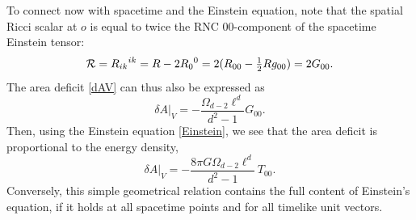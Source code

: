 \documentclass[aps,prd,showpacs,groupedaddress,nofootinbib,longbibliography,12pt]{revtex4-1}
\def\beq{\begin{equation}}
\def\eeq{\end{equation}}
\def\d{\delta}\def\D{\Delta}
\def\O{\Omega}
\def\half{{\textstyle{\frac{1}{2}}}}
\begin{document}
To connect now with spacetime and the Einstein equation, note that the spatial Ricci scalar 
at $o$ is equal to twice the RNC $00$-component of the spacetime Einstein tensor: 
%
\beq\label{RG00}
{\cal R}=R_{ik}{}^{ik}=R-2R_0{}^0=2(R_{00}-\half R g_{00})=2G_{00}.
\eeq
%
The area deficit \eqref{dAV} can thus also be expressed as 
%
\beq\label{dAVG}
\d A|_V = -\frac{\O_{d-2}\ell^d}{d^2-1} G_{00}.
\eeq
%
Then, using the Einstein equation \eqref{Einstein}, 
we see that the area deficit is proportional to the energy density,
%
\beq\label{dAT}
\d A|_V = - \frac{8\pi G\O_{d-2}\ell^d}{d^2-1} \,T_{00}.
\eeq
%
Conversely, this
simple geometrical relation contains the full content of Einstein's equation,
if it holds at all spacetime points and for all timelike unit vectors. 
\end{document}
